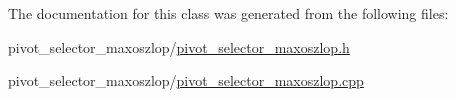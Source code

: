 The documentation for this class was generated from the following files\+:\begin{DoxyCompactItemize}
\item 
pivot\+\_\+selector\+\_\+maxoszlop/\hyperlink{pivot__selector__maxoszlop_8h}{pivot\+\_\+selector\+\_\+maxoszlop.\+h}\item 
pivot\+\_\+selector\+\_\+maxoszlop/\hyperlink{pivot__selector__maxoszlop_8cpp}{pivot\+\_\+selector\+\_\+maxoszlop.\+cpp}\end{DoxyCompactItemize}
